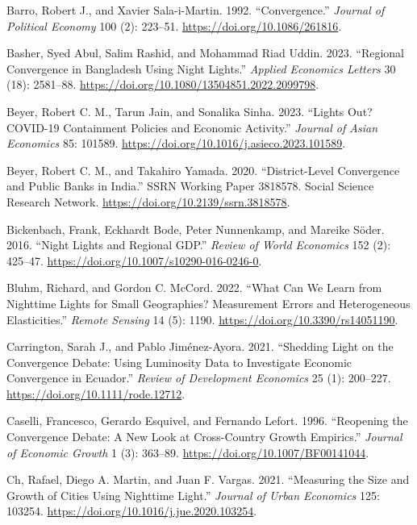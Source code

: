 \documentclass[
  letterpaper,
  DIV=11,
  numbers=noendperiod]{scrartcl}
\newlength{\cslhangindent}
\newenvironment{CSLReferences}[2] %
 {\begin{list}{}{%
  \setlength{\itemindent}{0pt}
  \setlength{\leftmargin}{0pt}
  \setlength{\parsep}{0pt}
  \ifodd #1
   \setlength{\leftmargin}{\cslhangindent}
   \setlength{\itemindent}{-1\cslhangindent}
  \fi
  \setlength{\itemsep}{#2\baselineskip}}}
 {\end{list}}
\begin{document}
\begin{CSLReferences}{1}{0}
Barro, Robert J., and Xavier Sala-i-Martin. 1992. {``Convergence.''}
\emph{Journal of Political Economy} 100 (2): 223--51.
\url{https://doi.org/10.1086/261816}.

Basher, Syed Abul, Salim Rashid, and Mohammad Riad Uddin. 2023.
{``Regional Convergence in {Bangladesh} Using Night Lights.''}
\emph{Applied Economics Letters} 30 (18): 2581--88.
\url{https://doi.org/10.1080/13504851.2022.2099798}.

Beyer, Robert C. M., Tarun Jain, and Sonalika Sinha. 2023. {``Lights
Out? {COVID}-19 Containment Policies and Economic Activity.''}
\emph{Journal of Asian Economics} 85: 101589.
\url{https://doi.org/10.1016/j.asieco.2023.101589}.

Beyer, Robert C. M., and Takahiro Yamada. 2020. {``District-Level
Convergence and Public Banks in {India}.''} SSRN Working Paper 3818578.
Social Science Research Network.
\url{https://doi.org/10.2139/ssrn.3818578}.

Bickenbach, Frank, Eckhardt Bode, Peter Nunnenkamp, and Mareike Söder.
2016. {``Night Lights and Regional {GDP}.''} \emph{Review of World
Economics} 152 (2): 425--47.
\url{https://doi.org/10.1007/s10290-016-0246-0}.

Bluhm, Richard, and Gordon C. McCord. 2022. {``What Can We Learn from
Nighttime Lights for Small Geographies? Measurement Errors and
Heterogeneous Elasticities.''} \emph{Remote Sensing} 14 (5): 1190.
\url{https://doi.org/10.3390/rs14051190}.

Carrington, Sarah J., and Pablo Jiménez-Ayora. 2021. {``Shedding Light
on the Convergence Debate: Using Luminosity Data to Investigate Economic
Convergence in {Ecuador}.''} \emph{Review of Development Economics} 25
(1): 200--227. \url{https://doi.org/10.1111/rode.12712}.

Caselli, Francesco, Gerardo Esquivel, and Fernando Lefort. 1996.
{``Reopening the Convergence Debate: A New Look at Cross-Country Growth
Empirics.''} \emph{Journal of Economic Growth} 1 (3): 363--89.
\url{https://doi.org/10.1007/BF00141044}.

Ch, Rafael, Diego A. Martin, and Juan F. Vargas. 2021. {``Measuring the
Size and Growth of Cities Using Nighttime Light.''} \emph{Journal of
Urban Economics} 125: 103254.
\url{https://doi.org/10.1016/j.jue.2020.103254}.


\end{CSLReferences}
\end{document}
